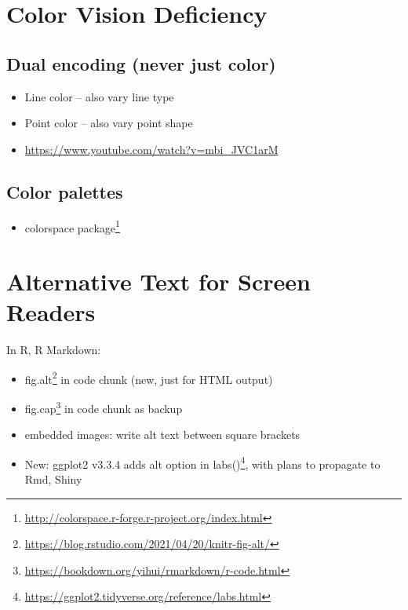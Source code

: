 \documentclass[
]{krantz}
\providecommand{\tightlist}{%
  \setlength{\itemsep}{0pt}\setlength{\parskip}{0pt}}
\renewcommand{\href}[2]{#2\footnote{\url{#1}}}
\begin{document}
\hypertarget{color-vision-deficiency}{%
\section{Color Vision Deficiency}\label{color-vision-deficiency}}

\hypertarget{dual-encoding-never-just-color}{%
\subsection{Dual encoding (never just color)}\label{dual-encoding-never-just-color}}

\begin{itemize}
\item
  Line color -- also vary line type
\item
  Point color -- also vary point shape
\item
  \url{https://www.youtube.com/watch?v=mbi_JVC1arM}
\end{itemize}

\hypertarget{color-palettes}{%
\subsection{Color palettes}\label{color-palettes}}

\begin{itemize}
\tightlist
\item
  \href{http://colorspace.r-forge.r-project.org/index.html}{colorspace package}
\end{itemize}

\hypertarget{alternative-text-for-screen-readers}{%
\section{Alternative Text for Screen Readers}\label{alternative-text-for-screen-readers}}

In R, R Markdown:

\begin{itemize}
\item
  \href{https://blog.rstudio.com/2021/04/20/knitr-fig-alt/}{fig.alt} in code chunk (new, just for HTML output)
\item
  \href{https://bookdown.org/yihui/rmarkdown/r-code.html}{fig.cap} in code chunk as backup
\item
  embedded images: write alt text between square brackets
\item
  New: ggplot2 v3.3.4 adds \href{https://ggplot2.tidyverse.org/reference/labs.html}{alt option in labs()}, with plans to propagate to Rmd, Shiny
\end{itemize}
\end{document}
